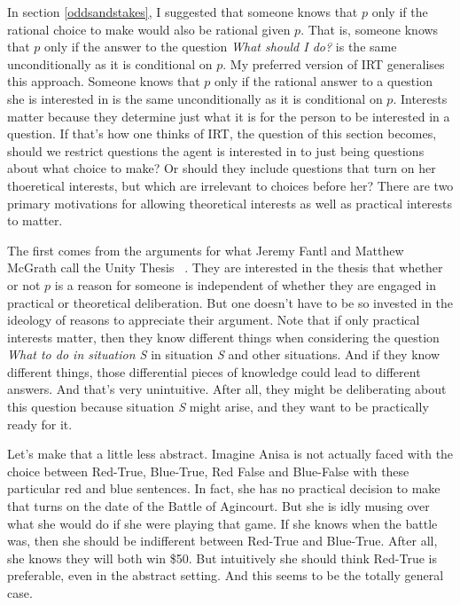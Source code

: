 \documentclass[11pt,]{book}
\begin{document}
In section \ref{oddsandstakes}, I suggested that someone knows that \(p\) only if the rational choice to make would also be rational given \(p\). That is, someone knows that \(p\) only if the answer to the question \emph{What should I do?} is the same unconditionally as it is conditional on \(p\). My preferred version of IRT generalises this approach. Someone knows that \(p\) only if the rational answer to a question she is interested in is the same unconditionally as it is conditional on \(p\). Interests matter because they determine just what it is for the person to be interested in a question. If that's how one thinks of IRT, the question of this section becomes, should we restrict questions the agent is interested in to just being questions about what choice to make? Or should they include questions that turn on her thoeretical interests, but which are irrelevant to choices before her? There are two primary motivations for allowing theoretical interests as well as practical interests to matter.

The first comes from the arguments for what Jeremy Fantl and Matthew McGrath call the Unity Thesis ~\citep[ 73--6]{FantlMcGrath2009}. They are interested in the thesis that whether or not \(p\) is a reason for someone is independent of whether they are engaged in practical or theoretical deliberation. But one doesn't have to be so invested in the ideology of reasons to appreciate their argument. Note that if only practical interests matter, then they know different things when considering the question \emph{What to do in situation \emph{S}} in situation \emph{S} and other situations. And if they know different things, those differential pieces of knowledge could lead to different answers. And that's very unintuitive. After all, they might be deliberating about this question because situation \emph{S} might arise, and they want to be practically ready for it.

Let's make that a little less abstract. Imagine Anisa is not actually faced with the choice between Red-True, Blue-True, Red False and Blue-False with these particular red and blue sentences. In fact, she has no practical decision to make that turns on the date of the Battle of Agincourt. But she is idly musing over what she would do if she were playing that game. If she knows when the battle was, then she should be indifferent between Red-True and Blue-True. After all, she knows they will both win \$50. But intuitively she should think Red-True is preferable, even in the abstract setting. And this seems to be the totally general case.
\end{document}
